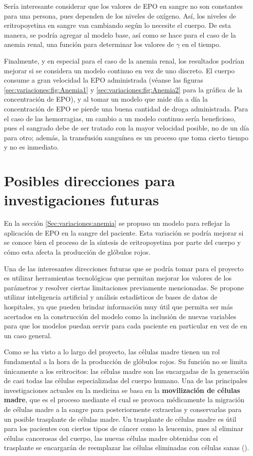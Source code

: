 Sería interesante considerar que los valores de EPO en sangre no son constantes para una persona, pues dependen de los niveles de oxígeno. Así, los niveles de eritropoyetina en sangre van cambiando según lo necesite el cuerpo. De esta manera, se podría agregar al modelo base, así como se hace para el caso de la anemia renal, una función para determinar los valores de $\gamma$ en el tiempo.

Finalmente, y en especial para el caso de la anemia renal, los resultados podrían mejorar si se considera un modelo continuo en vez de uno discreto. El cuerpo consume a gran velocidad la EPO administrada (véanse las figuras \ref{sec:variaciones:fig:Anemia1} y \ref{sec:variaciones:fig:Anemia2} para la gráfica de la concentración de EPO), y al tomar un modelo que mide día a día la concentración de EPO se pierde una buena cantidad de droga administrada. Para el caso de las hemorragias, un cambio a un modelo continuo sería beneficioso, pues el sangrado debe de ser tratado con la mayor velocidad posible, no de un día para otro; además, la transfusión sanguínea es un proceso que toma cierto tiempo y no es inmediato. 

\section{Posibles direcciones para investigaciones futuras}

En la sección \ref{Sec:variaciones:anemia} se propuso un modelo para reflejar la aplicación de EPO en la sangre del paciente. Esta variación se podría mejorar si se conoce bien el proceso de la síntesis de eritropoyetina por parte del cuerpo y cómo esta afecta la producción de glóbulos rojos.

Una de las interesantes direcciones futuras que se podría tomar para el proyecto es utilizar herramientas tecnológicas que permitan mejorar los valores de los parámetros y resolver ciertas limitaciones previamente mencionadas. Se propone utilizar inteligencia artificial y análisis estadísticos de bases de datos de hospitales, ya que pueden brindar información muy útil que permita ser más acertados en la construcción del modelo como la inclusión de nuevas variables para que los modelos puedan servir para cada paciente en particular en vez de en un caso general.

Como se ha visto a lo largo del proyecto, las células madre tienen un rol fundamental a la hora de la producción de glóbulos rojos. Su función no se limita únicamente a los eritrocitos: las células madre son las encargadas de la generación de casi todas las células especializadas del cuerpo humano. Una de las principales investigaciones actuales en la medicina se basa en la \textbf{movilización de células madre}, que es el proceso mediante el cual se provoca médicamente la migración de células madre a la sangre para posteriormente extraerlas y conservarlas para un posible trasplante de células madre. Un trasplante de células madre es útil para los pacientes con ciertos tipos de cáncer como la leucemia, pues al eliminar células cancerosas del cuerpo, las nuevas células madre obtenidas con el trasplante se encargarán de reemplazar las células eliminadas con células sanas (\cite{Trasplante}).  

